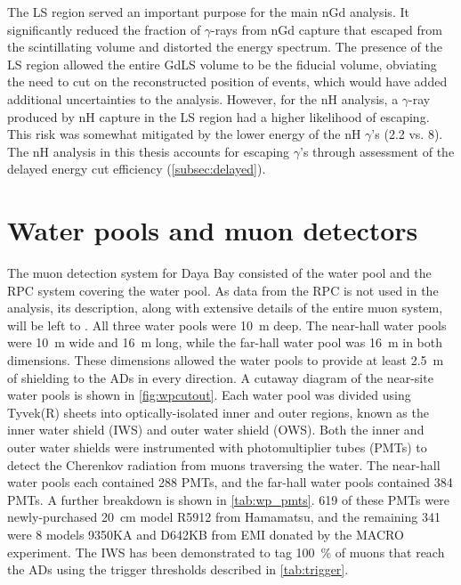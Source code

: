 The LS region served an important purpose for the main nGd \thetaot{} analysis.
It significantly reduced the fraction of $\gamma$-rays from nGd capture
that escaped from the scintillating volume and distorted the energy spectrum.
The presence of the LS region allowed the entire GdLS volume to be
the fiducial volume, obviating the need to cut on the reconstructed position
of events, which would have added additional uncertainties to the analysis.
However, for the nH analysis,
a $\gamma$-ray produced by nH capture in the LS region
had a higher likelihood of escaping.
This risk was somewhat mitigated by the lower energy of the nH $\gamma$'s
(\SI{2.2}{\mev} vs. \SI{8}{\mev}).
The nH \thetaot{} analysis in this thesis accounts for escaping $\gamma$'s
through assessment of the delayed energy cut efficiency (\cref{subsec:delayed}).


\section{Water pools and muon detectors}
\label{sec:wp}

The muon detection system for Daya Bay consisted of
the water pool and the RPC system covering the water pool.
As data from the RPC is not used in the \thetaot{} analysis,
its description, along with extensive details of the entire muon system,
will be left to \cite{muonsystem2015}.
All three water pools were \SI{10}{\m} deep.
The near-hall water pools were \SI{10}{\m} wide and \SI{16}{\m} long,
while the far-hall water pool was \SI{16}{\m} in both dimensions.
These dimensions allowed the water pools to provide at least \SI{2.5}{\m} of shielding
to the ADs in every direction.
A cutaway diagram of the near-site water pools is shown in \cref{fig:wpcutout}.
Each water pool was divided using Tyvek(R) sheets
into optically-isolated inner and outer regions,
known as the inner water shield (IWS) and outer water shield (OWS).
Both the inner and outer water shields were instrumented with photomultiplier tubes (PMTs)
to detect the Cherenkov radiation from muons traversing the water.
The near-hall water pools each contained \num{288} PMTs,
and the far-hall water pools contained \num{384} PMTs.
A further breakdown is shown in \cref{tab:wp_pmts}.
\num{619} of these PMTs were newly-purchased \SI{20}{\cm}
model R5912 from Hamamatsu,
and the remaining \num{341} were \SI{8}{\inch} models 9350KA
and D642KB from EMI
donated by the MACRO experiment.
The IWS has been demonstrated to tag \SI{100}{\percent} of muons
that reach the ADs using the trigger thresholds described in \cref{tab:trigger}.


